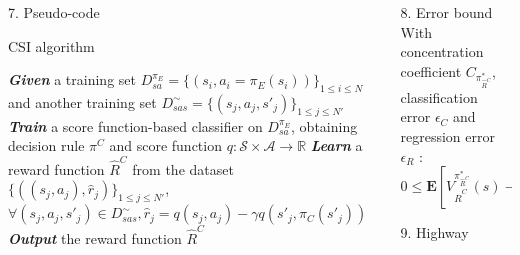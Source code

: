 \documentclass[xcolor=x11names,12pt]{beamer}
\newcommand{\expertdistrib}{\rho_E}
\newcommand{\apprRc}{\hat{R}^C}
\newcommand{\actionspace}{\mathcal{A}}
\newcommand{\statespace}{\mathcal{S}}
\newcommand{\nbsamples}{N}
\newcommand{\optimalpolicy}[1]{\pi^*_{#1}}
\newcommand{\expertpolicy}{\pi_E}
\newcommand{\satrace}[1]{D^{#1}_{sa}}
\newcommand{\ccoeffpi}[1]{C_{#1}}
\newcommand{\rlvalue}[2]{V^{#1}_{#2}}
\newcommand{\sastrace}[1]{D^{#1}_{sas}}
\newcommand{\expectationknowing}[2]{\mathbf{E}\left[\left.#1\right|#2\right]}
\begin{document}
\begin{frame}
\begin{columns}
\begin{column}{.48\textwidth}
\begin{block}{7. Pseudo-code}
{        \begin{algorithm}[H]
  \caption{CSI algorithm}
  \label{algo:cascading}
  \emph{\textbf{Given}} a training set $\satrace{\expertpolicy}=\{(s_i,a_i=\pi_E(s_i))\}_{1\leq i \leq \nbsamples}$\\and another training set $\sastrace{\sim}=\{(s_{j},a_{j},s'_{j})\}_{1\leq j \leq \nbsamples'}$\;
  \emph{\textbf{Train}} a score function-based classifier on $\satrace{\expertpolicy}$, obtaining decision rule $\pi^C$ and score function $q:\statespace\times \actionspace \rightarrow \mathbb R$\;
  \emph{\textbf{Learn}} a reward function $\hat R^C$ from the dataset $\{((s_{j},a_{j}),\hat{r}_j)\}_{1\leq j \leq \nbsamples'}$, $\forall (s_j,a_j,s'_j) \in \sastrace{\sim},\hat{r}_j=q(s_{j},a_{j})-\gamma q(s'_{j},\pi_C(s'_{j}))$\;
  \emph{\textbf{Output}} the reward function $\hat R^{C}$ \;
\end{algorithm}
      }
    \end{block}
  \end{column}
  \begin{column}{.48\textwidth}
    \vfill
    \begin{block}{8. Error bound}
      With concentration coefficient $\ccoeffpi{\optimalpolicy{\apprRc}}$, classification error $\epsilon_C$ and regression error $\epsilon_R$ :
\begin{equation}
0\leq\expectationknowing{\rlvalue{\optimalpolicy{\apprRc}}{\apprRc}(s)-\rlvalue{\expertpolicy}{\apprRc}(s)}{s\sim\expertdistrib}\leq \frac{1}{1-\gamma}\left(\epsilon_C\Delta q +\epsilon_R(1+\ccoeffpi{\optimalpolicy{\apprRc}})\right).
\end{equation}
    \end{block}
    \vfill
    \begin{block}{9. Highway}
      \begin{columns}
        \begin{column}{0.001\textwidth}
          \vspace{7cm}
        \end{column}
        \begin{column}{\textwidth}
          \centering
          \fontsize{11pt}{11pt}\selectfont
\end{column}
\end{columns}
\end{block}
\end{column}
\end{columns}
\end{frame}
\end{document}
